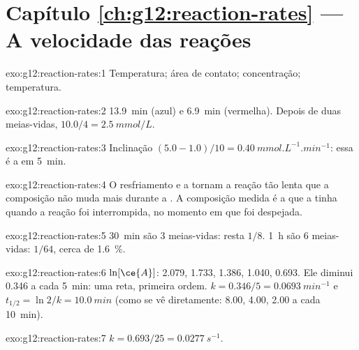 \section*{Capítulo \ref{ch:g12:reaction-rates} --- A velocidade das reações}

\begin{solution}{exo:g12:reaction-rates:1}
Temperatura; área de contato; concentração; temperatura.
\end{solution}

\begin{solution}{exo:g12:reaction-rates:2}
\qty{13.9}{min} (azul) e \qty{6.9}{min} (vermelha). Depois de duas
meias-vidas, $10.0 / 4 = \qty{2.5}{mmol/L}$.
\end{solution}

\begin{solution}{exo:g12:reaction-rates:3}
Inclinação $(5.0 - 1.0)/10 = \qty{0.40}{mmol.L^{-1}.min^{-1}}$: essa é a
 em \qty{5}{min}.
\end{solution}

\begin{solution}{exo:g12:reaction-rates:4}
O resfriamento e a  tornam a reação tão lenta que a composição
não muda mais durante a . A composição medida é a que a 
tinha quando a reação foi interrompida, no momento em que foi despejada.
\end{solution}

\begin{solution}{exo:g12:reaction-rates:5}
\qty{30}{min} são 3 meias-vidas: resta $1/8$. \qty{1}{h} são 6
meias-vidas: $1/64$, cerca de \qty{1.6}{\percent}.
\end{solution}

\begin{solution}{exo:g12:reaction-rates:6}
$\ln[\ce{A}]$: 2.079, 1.733, 1.386, 1.040, 0.693. Ele diminui 0.346 a
cada \qty{5}{min}: uma reta, primeira ordem. $k = 0.346/5 =
\qty{0.0693}{min^{-1}}$ e $t_{1/2} = \ln 2 / k = \qty{10.0}{min}$ (como
se vê diretamente: 8.00, 4.00, 2.00 a cada \qty{10}{min}).
\end{solution}

\begin{solution}{exo:g12:reaction-rates:7}
$k = 0.693 / 25 = \qty{0.0277}{s^{-1}}$.
\end{solution}

